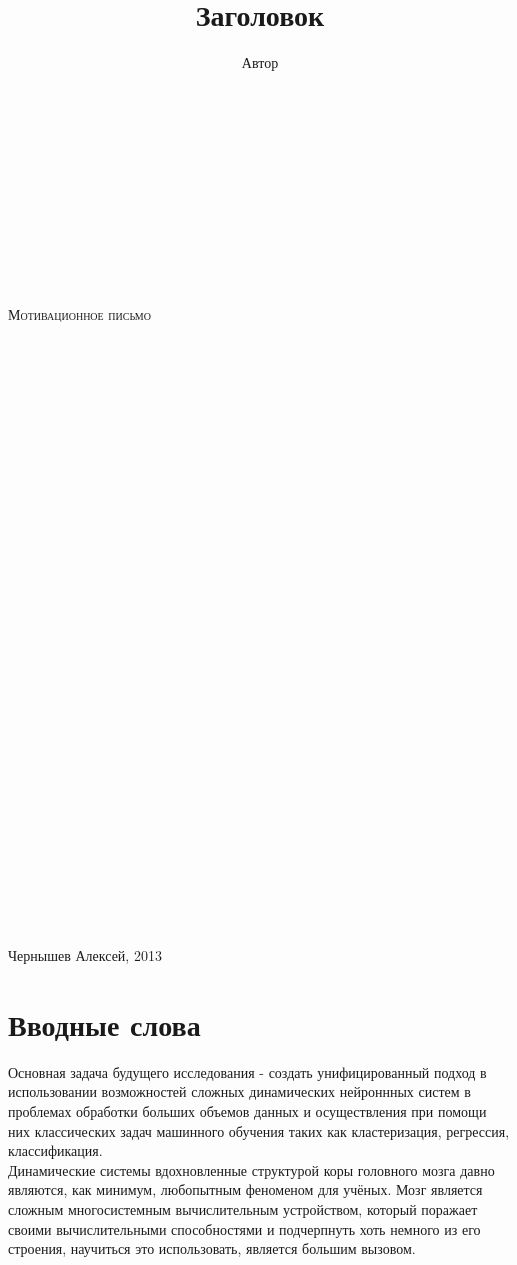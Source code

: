 \documentclass[a4paper,10pt]{article}
\title{Заголовок}
\author{Автор}
\begin{document}
\begin{center}
\thispagestyle{empty}
\centering
\ \\
\ \\
\ \\
\ \\
\ \\
\ \\
\ \\
\ \\
\ \\
\textsc{\Large Мотивационное письмо}\\[1cm]
\ \\
\ \\
\ \\
\ \\
\ \\
\ \\
\ \\
\ \\
\ \\
\ \\
\ \\
\ \\
\ \\
\ \\
\ \\
\ \\
\ \\
\ \\
\ \\
\ \\
\ \\
\ \\
\ \\
\ \\
\ \\
\ \\
\ \\
\ \\
\ \\
\ \\
\ \\
\end{center}
Чернышев Алексей, 2013

\newpage
\tableofcontents
\newpage
\setlength{\parindent}{10pt}

\section{Вводные слова}
Основная задача будущего исследования - создать унифицированный подход в использовании возможностей сложных динамических нейроннных систем в проблемах обработки больших объемов данных и осуществления при помощи них классических задач машинного обучения таких как кластеризация, регрессия, классификация.\\
\indent Динамические системы вдохновленные структурой коры головного мозга давно являются, как минимум, любопытным феноменом для учёных. Мозг является сложным многосистемным вычислительным устройством, который поражает своими вычислительными способностями и подчерпнуть хоть немного из его строения, научиться это использовать, является большим вызовом.
\end{document}
